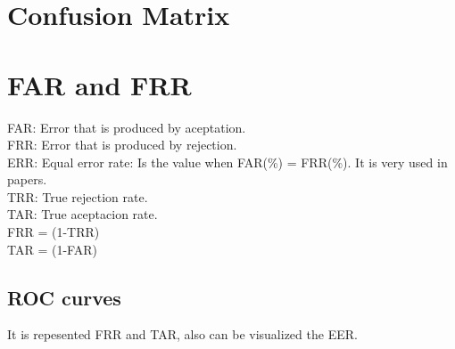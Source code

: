 \documentclass[a4paper]{article}
\begin{document}
\section{Confusion Matrix}


\section{FAR and FRR}
FAR: Error that is produced by aceptation.\\
FRR: Error that is produced by rejection.\\
ERR: Equal error rate: Is the value when FAR(\%) = FRR(\%). It is very used in papers.\\
TRR: True rejection rate.\\
TAR: True aceptacion rate.\\
FRR = (1-TRR)\\
TAR = (1-FAR)\\

\subsection{ROC curves}
It is repesented FRR and TAR, also can be visualized the EER.\\
\end{document}
